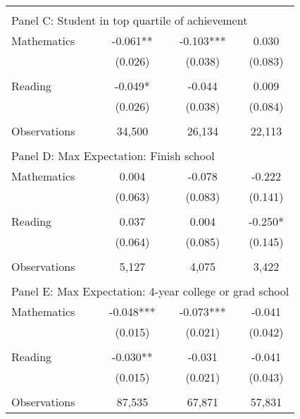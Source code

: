 {\begin{tabular}{lccc}
&  &  &   \\
\multicolumn{4}{l}{Panel C: Student in top quartile of achievement} \\
\hspace{3mm}Mathematics&      -0.061** &      -0.103***&       0.030   \\
                    &     (0.026)   &     (0.038)   &     (0.083)   \\
 
&  &  &   \\
\hspace{3mm}Reading &      -0.049*  &      -0.044   &       0.009   \\
                    &     (0.026)   &     (0.038)   &     (0.084)   \\
                    &               &               &               \\
\hspace{3mm}Observations&      34,500   &      26,134   &      22,113   \\
 
&  &  &   \\
\multicolumn{4}{l}{Panel D: Max Expectation: Finish school} \\
\hspace{3mm}Mathematics&       0.004   &      -0.078   &      -0.222   \\
                    &     (0.063)   &     (0.083)   &     (0.141)   \\
 
&  &  &   \\
\hspace{3mm}Reading &       0.037   &       0.004   &      -0.250*  \\
                    &     (0.064)   &     (0.085)   &     (0.145)   \\
                    &               &               &               \\
\hspace{3mm}Observations&       5,127   &       4,075   &       3,422   \\
 
&  &  &   \\
\multicolumn{4}{l}{Panel E: Max Expectation: 4-year college or grad school} \\
\hspace{3mm}Mathematics&      -0.048***&      -0.073***&      -0.041   \\
                    &     (0.015)   &     (0.021)   &     (0.042)   \\
 
&  &  &   \\
\hspace{3mm}Reading &      -0.030** &      -0.031   &      -0.041   \\
                    &     (0.015)   &     (0.021)   &     (0.043)   \\
                    &               &               &               \\
\hspace{3mm}Observations&      87,535   &      67,871   &      57,831   \\
 

\bottomrule
\end{tabular}
}
